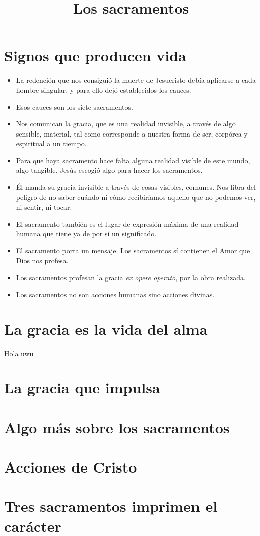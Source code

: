 \documentclass{article}
\title{Los sacramentos}
\begin{document}
    \maketitle
    \section*{Signos que producen vida}
        \begin{itemize}
            \item La redención que nos consiguió la muerte de Jesucristo debía aplicarse a cada hombre singular, y para ello dejó establecidos los cauces. 
            \item Esos cauces son los siete sacramentos.
            \item Nos comunican la gracia, que es una realidad invisible, a través de algo sensible, material, tal como corresponde a nuestra forma de ser, corpórea y espiritual a un tiempo.
            \item Para que haya sacramento hace falta alguna realidad visible de este mundo, algo tangible. Jesús escogió algo para hacer los sacramentos.
            \item Él manda su gracia invisible a través de cosas visibles, comunes. Nos libra del peligro de no saber cuándo ni cómo recibiríamos aquello que no podemos ver, ni sentir, ni tocar.
            \item El sacramento también es el lugar de expresión máxima de una realidad humana que tiene ya de por sí un significado.
            \item El sacramento porta un mensaje. Los sacramentos sí contienen el Amor que Dios nos profesa. 
            \item Los sacramentos profesan la gracia \textit{ex opere operato}, por la obra realizada. 
            \item Los sacramentos no son acciones humanas sino acciones divinas. 
        \end{itemize}

    \section*{La gracia es la vida del alma}
        Hola uwu
    \section*{La gracia que impulsa}

    \section*{Algo más sobre los sacramentos}

    \section*{Acciones de Cristo}

    \section*{Tres sacramentos imprimen el carácter}
\end{document}
